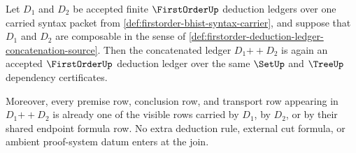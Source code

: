 \begin{theorem}\label{thm:firstorder-deduction-ledger-concatenation-closure}
Let $D_1$ and $D_2$ be accepted finite $\FirstOrderUp$ deduction ledgers over one carried syntax packet from \autoref{def:firstorder-bhist-syntax-carrier}, and suppose that $D_1$ and $D_2$ are composable in the sense of \autoref{def:firstorder-deduction-ledger-concatenation-source}. Then the concatenated ledger $D_1 \mathbin{+\!\!+} D_2$ is again an accepted $\FirstOrderUp$ deduction ledger over the same $\SetUp$ and $\TreeUp$ dependency certificates.

Moreover, every premise row, conclusion row, and transport row appearing in $D_1 \mathbin{+\!\!+} D_2$ is already one of the visible rows carried by $D_1$, by $D_2$, or by their shared endpoint formula row. No extra deduction rule, external cut formula, or ambient proof-system datum enters at the join.
\end{theorem}
